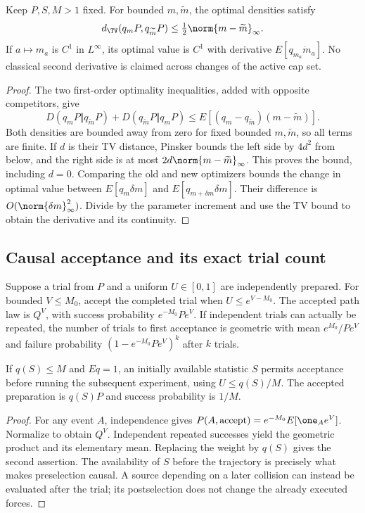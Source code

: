 \begin{proposition}\label{prop:cap-response}
Keep $P,S,M>1$ fixed. For bounded $m,\widetilde m$, the optimal densities satisfy
\[
 d_{\TV}(q_mP,q_{\widetilde m}P)\le\tfrac12\norm{m-\widetilde m}_\infty.
\]
If $a\mapsto m_a$ is $C^1$ in $L^\infty$, its optimal value is $C^1$ with derivative $E[q_{m_a}\dot m_a]$. No classical second derivative is claimed across changes of the active cap set.
\end{proposition}
\begin{proof}
The two first-order optimality inequalities, added with opposite competitors, give
\[
 D(q_mP\Vert q_{\widetilde m}P)+D(q_{\widetilde m}P\Vert q_mP)
 \le E[(q_m-q_{\widetilde m})(m-\widetilde m)].
\]
Both densities are bounded away from zero for fixed bounded $m,\widetilde m$, so all terms are finite. If $d$ is their TV distance, Pinsker bounds the left side by $4d^2$ from below, and the right side is at most $2d\norm{m-\widetilde m}_\infty$. This proves the bound, including $d=0$. Comparing the old and new optimizers bounds the change in optimal value between $E[q_m\delta m]$ and $E[q_{m+\delta m}\delta m]$. Their difference is $O(\norm{\delta m}_\infty^2)$. Divide by the parameter increment and use the TV bound to obtain the derivative and its continuity.
\end{proof}

\subsection{Causal acceptance and its exact trial count}
\begin{proposition}\label{prop:acceptance}
Suppose a trial from $P$ and a uniform $U\in[0,1]$ are independently prepared. For bounded $V\le M_0$, accept the completed trial when $U\le e^{V-M_0}$. The accepted path law is $Q^V$, with success probability $e^{-M_0}Pe^V$. If independent trials can actually be repeated, the number of trials to first acceptance is geometric with mean $e^{M_0}/Pe^V$ and failure probability $(1-e^{-M_0}Pe^V)^k$ after $k$ trials.

If $q(S)\le M$ and $Eq=1$, an initially available statistic $S$ permits acceptance before running the subsequent experiment, using $U\le q(S)/M$. The accepted preparation is $q(S)P$ and success probability is $1/M$.
\end{proposition}
\begin{proof}
For any event $A$, independence gives
$P(A,\mathrm{accept})=e^{-M_0}E[\one_Ae^V]$.
Normalize to obtain $Q^V$. Independent repeated successes yield the geometric product and its elementary mean. Replacing the weight by $q(S)$ gives the second assertion. The availability of $S$ before the trajectory is precisely what makes preselection causal. A source depending on a later collision can instead be evaluated after the trial; its postselection does not change the already executed forces.
\end{proof}

